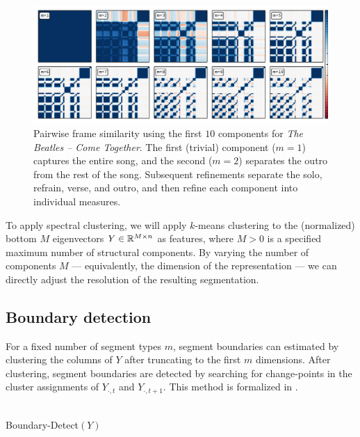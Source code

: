 \documentclass{article}
\begin{document}
 
\begin{figure}
\centering
\includegraphics[width=\textwidth]{figs/lowrank}
\caption{Pairwise frame similarity using the first $10$ components for \emph{The Beatles -- Come Together}.  The first
(trivial) component ($m=1$) captures the entire song, and the second ($m=2$) separates
the outro from the rest of the song.  Subsequent refinements separate the solo,
refrain, verse, and outro, and then refine each component into individual measures.\label{lowrank}}
\end{figure}

To apply spectral clustering, we will apply $k$-means clustering to the (normalized) 
bottom $M$ eigenvectors $Y \in \mathbb{R}^{M \times n}$ as features, where $M > 0$ is a 
specified maximum number of structural components.  By varying the number of
components $M$ --- equivalently, the dimension of the representation --- we can
directly adjust the resolution of the resulting segmentation.


\subsection{Boundary detection}
For a fixed number of segment types $m$, segment boundaries can estimated 
by clustering the columns of $Y$ after truncating to the first $m$ dimensions.
After clustering, segment boundaries are detected by searching for change-points in
the cluster assignments of $Y_{\cdot,t}$ and $Y_{\cdot,t+1}$.  This method is
formalized in .

\begin{algorithm}
\caption{Boundary detection\label{bd}}
\begin{algorithmic}[1]
\\
{\sc Boundary-Detect}$(Y)$
\end{algorithmic}
\end{algorithm}
\end{document}
